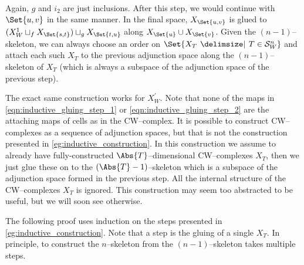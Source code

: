 \documentclass[class=article, crop=false]{standalone}
\begin{document}
\begin{example}
\begin{equation}
\begin{tikzcd}
        \end{tikzcd}
        \label{eqn:inductive_gluing_step_2}
    \end{equation}
    Again, $g$ and $i_2$ are just inclusions. After this step, we would continue with $\Set{u,v}$ in the same manner. In the final space, $X_{\Set{u,v}}$ is glued to $(X^1_W \sqcup_f X_{\Set{s,t}}) \sqcup_g X_{\Set{t,u}}$ along $X_{\Set{u}} \cup X_{\Set{v}}$. Given the $(n-1)$--skeleton, we can always choose an order on $\Set{X_{T} \given T \in \mathcal{S}^n_W}$ and attach each such $X_{T}$ to the previous adjunction space along the $(n-1)$--skeleton of $X_{T}$ (which is always a subspace of the adjunction space of the previous step).
\end{example}

The exact same construction works for $X^\prime_W$. Note that none of the maps in \eqref{eqn:inductive_gluing_step_1} or \eqref{eqn:inductive_gluing_step_2} are the attaching maps of cells as in the CW--complex. It is possible to construct CW--complexes as a sequence of adjunction spaces, but that is not the construction presented in \cref{eg:inductive_construction}. In this construction we assume to already have fully-constructed $\Abs{T}$--dimensional CW--complexes $X_T$, then we just glue these on to the $(\Abs{T}-1)$--skeleton which is a subspace of the adjunction space formed in the previous step. All the internal structure of the CW--complexes $X_T$ is ignored. This construction may seem too abstracted to be useful, but we will soon see otherwise.

The following proof uses induction on the steps presented in \cref{eg:inductive_construction}. Note that a step is the gluing of a single $X_T$. In principle, to construct the $n$--skeleton from the $(n-1)$--skeleton takes multiple steps.
\end{document}
